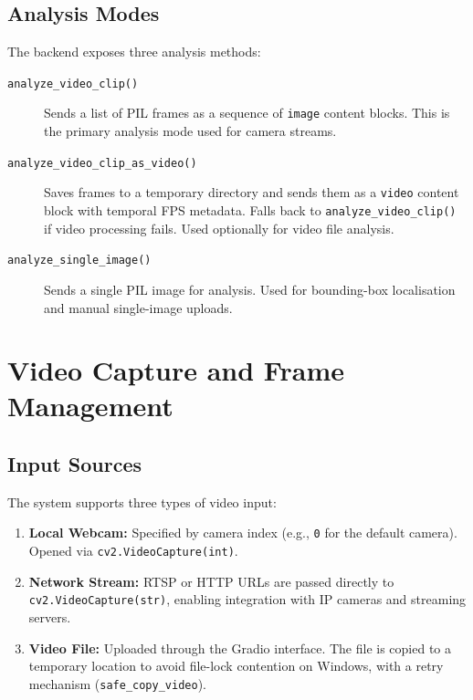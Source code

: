 \documentclass[12pt,a4paper]{article}
\begin{document}
\subsection{Analysis Modes}

The backend exposes three analysis methods:

\begin{description}
    \item[\texttt{analyze\_video\_clip()}] Sends a list of PIL frames as a sequence of \texttt{image} content blocks. This is the primary analysis mode used for camera streams.
    \item[\texttt{analyze\_video\_clip\_as\_video()}] Saves frames to a temporary directory and sends them as a \texttt{video} content block with temporal FPS metadata. Falls back to \texttt{analyze\_video\_clip()} if video processing fails. Used optionally for video file analysis.
    \item[\texttt{analyze\_single\_image()}] Sends a single PIL image for analysis. Used for bounding-box localisation and manual single-image uploads.
\end{description}

\section{Video Capture and Frame Management}

\subsection{Input Sources}

The system supports three types of video input:

\begin{enumerate}
    \item \textbf{Local Webcam:} Specified by camera index (e.g., \texttt{0} for the default camera). Opened via \texttt{cv2.VideoCapture(int)}.
    \item \textbf{Network Stream:} RTSP or HTTP URLs are passed directly to \texttt{cv2.VideoCapture(str)}, enabling integration with IP cameras and streaming servers.
    \item \textbf{Video File:} Uploaded through the Gradio interface. The file is copied to a temporary location to avoid file-lock contention on Windows, with a retry mechanism (\texttt{safe\_copy\_video}).
\end{enumerate}
\end{document}
